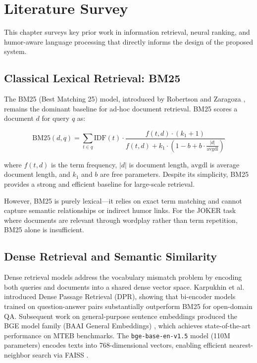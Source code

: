 \chapter{Literature Survey}
\justify

This chapter surveys key prior work in information retrieval, neural ranking, and humor-aware language processing that directly informs the design of the proposed system.

\section{Classical Lexical Retrieval: BM25}

The BM25 (Best Matching 25) model, introduced by Robertson and Zaragoza \cite{bm25}, remains the dominant baseline for ad-hoc document retrieval. BM25 scores a document $d$ for query $q$ as:

\begin{equation}
\text{BM25}(d,q) = \sum_{t \in q} \text{IDF}(t) \cdot \frac{f(t,d) \cdot (k_1+1)}{f(t,d) + k_1 \cdot \left(1 - b + b \cdot \frac{|d|}{\text{avgdl}}\right)}
\end{equation}

where $f(t,d)$ is the term frequency, $|d|$ is document length, $\text{avgdl}$ is average document length, and $k_1$ and $b$ are free parameters. Despite its simplicity, BM25 provides a strong and efficient baseline for large-scale retrieval.

However, BM25 is purely lexical---it relies on exact term matching and cannot capture semantic relationships or indirect humor links. For the JOKER task where documents are relevant through wordplay rather than term repetition, BM25 alone is insufficient.

\section{Dense Retrieval and Semantic Similarity}

Dense retrieval models address the vocabulary mismatch problem by encoding both queries and documents into a shared dense vector space. Karpukhin et al.\ \cite{dpr} introduced Dense Passage Retrieval (DPR), showing that bi-encoder models trained on question-answer pairs substantially outperform BM25 for open-domain QA. Subsequent work on general-purpose sentence embeddings produced the BGE model family (BAAI General Embeddings) \cite{bge}, which achieves state-of-the-art performance on MTEB benchmarks. The \texttt{bge-base-en-v1.5} model (110M parameters) encodes texts into 768-dimensional vectors, enabling efficient nearest-neighbor search via FAISS \cite{faiss}.

